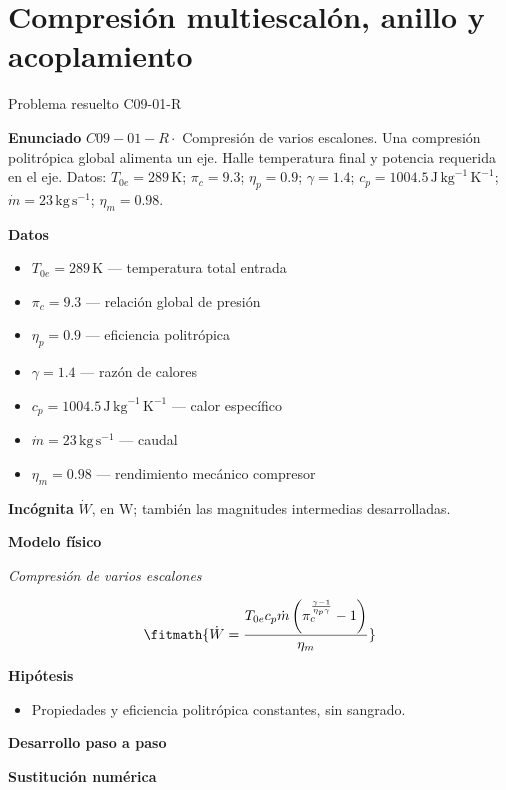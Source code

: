 \documentclass[10pt,openany]{book}
\begin{document}
\chapter{Compresión multiescalón, anillo y acoplamiento}
\begin{studiumworked}{Problema resuelto C09-01-R}


\noindent\textbf{Enunciado}
\(C09-01-R \cdot\) Compresión de varios escalones. Una compresión politrópica global alimenta un eje. Halle temperatura final y potencia requerida en el eje. Datos: \(T_{0e}=289\, \mathrm{K}\); \(\pi_c=9.3\); \(\eta_p=0.9\); \(\gamma=1.4\); \(c_p=1004.5\, \mathrm{J}\,\mathrm{kg}^{-1}\,\mathrm{K}^{-1}\); \(\dot m=23\, \mathrm{kg}\,\mathrm{s}^{-1}\); \(\eta_m=0.98\).

\noindent\textbf{Datos}
\begin{itemize}
\item $T_{0e} = 289\,\mathrm{K}$ — temperatura total entrada
\item $\pi_c = 9.3$ — relación global de presión
\item $\eta_p = 0.9$ — eficiencia politrópica
\item $\gamma = 1.4$ — razón de calores
\item $c_p = 1004.5\,\mathrm{J}\,\mathrm{kg}^{-1}\,\mathrm{K}^{-1}$ — calor específico
\item $\dot m = 23\,\mathrm{kg}\,\mathrm{s}^{-1}$ — caudal
\item $\eta_m = 0.98$ — rendimiento mecánico compresor
\end{itemize}

\noindent\textbf{Incógnita}
$\dot{W}$, en $\mathrm{W}$; también las magnitudes intermedias desarrolladas.

\noindent\textbf{Modelo físico}

\noindent\textit{Compresión de varios escalones}

\[
\fitmath{\dot{W}=\frac{T_{0e} c_p \dot m \left(\pi_c^{\frac{\gamma - 1}{\eta_p \gamma}} - 1\right)}{\eta_m}}
\]

\noindent\textbf{Hipótesis}
\begin{itemize}
\item Propiedades y eficiencia politrópica constantes, sin sangrado.
\end{itemize}

\noindent\textbf{Desarrollo paso a paso}



\noindent\textbf{Sustitución numérica}


\end{studiumworked}
\end{document}
